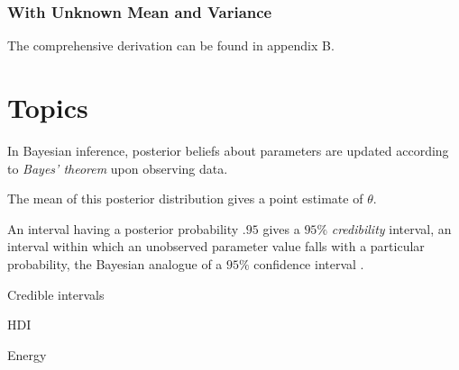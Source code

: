 \subsubsection{With Unknown Mean and Variance}

The comprehensive derivation can be found in appendix B. 


\section{Topics} 

In Bayesian inference, posterior beliefs about parameters are updated according to \textit{Bayes' theorem} upon observing data.  

The mean of this posterior distribution gives a point estimate of $\theta$. 

An interval having a posterior probability $.95$ gives a $95\%$ \textit{credibility} interval, an interval within which an unobserved parameter value falls with a particular probability, the Bayesian analogue of a $95\%$ confidence interval \cite[p. 777]{STK}.

Credible intervals 

HDI 

Energy